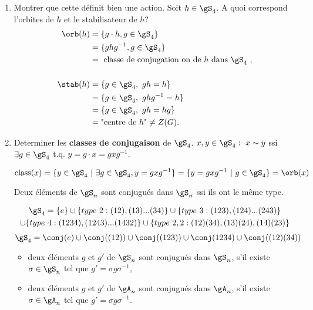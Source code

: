 \begin{exercise}

	\begin{enumerate}
		\item Montrer que cette définit bien une action. Soit $h\in\gS_4$. A quoi correspond l'orbites de $h$ et le stabilisateur de $h$?
		\begin{align*}
			\orb(h) &= \{g\cdot h, g\in\gS_4\}\\
			&= \{ghg^{-1}, g\in\gS_4\}\\
			&= \mbox{ classe de conjugation on de $h$ dans $\gS_4$ },
			\\
			\\
			\stab(h) &= \{g\in\gS_4,\ gh=h\}\\
			&= \{g\in\gS_4,\ ghg^{-1}=h\}\\
			&= \{g\in\gS_4,\ gh=hg\}\\
			&= \mbox{"centre de $h$"} \neq Z(G).
		\end{align*}

		\item Determiner les \textbf{classes de conjugaison} de $\gS_4$. $x,y\in \gS_4:\ x\sim y$ ssi $\exists g\in \gS_4$ t.q. $y=g\cdot x=gxg^{-1}$. 

		$$\mbox{class}(x)=\{y\in\gS_4\ |\ \exists g\in\gS_4, y=gxg^{-1}\}=\{y=gxg^{-1}\ |\ g\in\gS_4\} = \orb(x)$$

		\begin{rappel}
			Deux éléments de $\gS_n$ sont conjugués dans $\gS_n$ ssi ils ont le même type.
		\end{rappel}
		\begin{multline*}
			\gS_4=\{e\}\cup\{type\ 2: (12),(13)...(34)\}\cup\{type\ 3:(123),(124)...(243)\} \\ \cup\{type\ 4: (1234),(1243)...(1432)\}\cup\{type\ 2,2: (12)(34),(13)(24),(14)(23)\}
		\end{multline*}
		$$\gS_4=\conj(e)\cup \conj((12))\cup \conj((123))\cup \conj(1234)\cup \conj((12)(34))$$

		\begin{remark}
			\leavevmode
			\begin{itemize}
				\item deux éléments $g$ et $g'$ de $\gS_n$ sont conjugués dans $\gS_n$, s'il existe $\sigma \in \gS_n$ tel que $g'=\sigma g \sigma^{-1}$,
				\item deux éléments $g$ et $g'$ de $\gA_n$ sont conjugués dans $\gA_n$, s'il existe $\sigma\in\gA_n$ tel que $g'=\sigma g\sigma^{-1}$.
			\end{itemize}
		\end{remark}


\end{enumerate}
\end{exercise}
